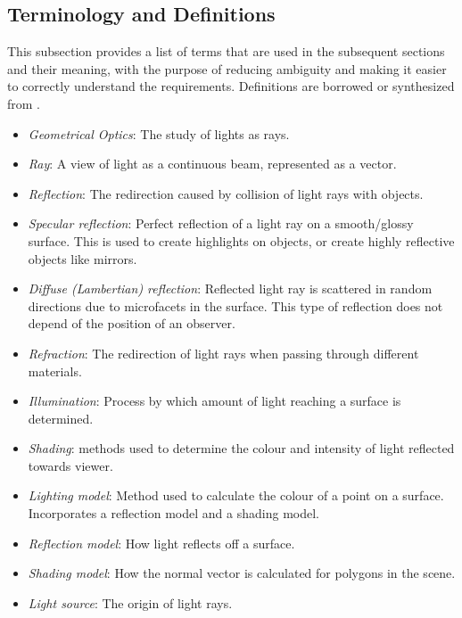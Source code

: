 \documentclass[12pt]{article}
\begin{document}
\subsection{Terminology and  Definitions}
This subsection provides a list of terms that are used in the subsequent
sections and their meaning, with the purpose of reducing ambiguity and making it
easier to correctly understand the requirements. Definitions are borrowed or 
synthesized from \cite{Lengyel2003,Comninos2005,shreiner2012}.

\begin{itemize}
\item[\label{}] \textit{Geometrical Optics}: The study of lights as rays.
\item[\label{}] \textit{Ray}: A view of light as a continuous beam, represented 
as a 
vector.
\item[\label{}] \textit{Reflection}: The redirection caused by collision of 
light rays 
with objects.
\item[\label{}] \textit{Specular reflection}: Perfect reflection of a light ray 
on a smooth/glossy surface. This is used to create highlights on objects, or 
create highly reflective objects like mirrors.
\item[\label{}] \textit{Diffuse (Lambertian) reflection}: Reflected light ray 
is scattered in random directions due to microfacets in the surface. This type 
of reflection does not depend of the position of an observer.
\item[\label{}] \textit{Refraction}: The redirection of light rays when passing 
through 
different materials.
\item[\label{}] \textit{Illumination}: Process by which amount of light 
reaching a 
surface is determined.
\item[\label{}] \textit{Shading}: methods used to determine the colour and 
intensity of 
light reflected towards viewer. 
\item[\label{}]\textit{ Lighting model}: Method used to calculate the colour of 
a point on a surface. Incorporates a reflection model and a shading model. 
\item[\label{}] \textit{Reflection model}: How light reflects off a surface. 
\item[\label{}] \textit{Shading model}: How the normal vector is calculated for 
polygons in the scene.
\item[\label{}] \textit{Light source}: The origin of light rays.

\end{itemize}
\end{document}
